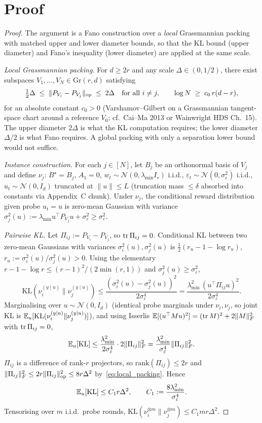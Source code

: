 \section*{Proof}

\begin{proof}
The argument is a Fano construction over a \emph{local} Grassmannian
packing with matched upper and lower diameter bounds, so that the KL
bound (upper diameter) and Fano's inequality (lower diameter) are
applied at the same scale.

\emph{Local Grassmannian packing.} For $d\ge 2r$ and any scale
$\Delta\in(0,1/2)$, there exist subspaces $V_1,\dots,V_N\in\mathrm{Gr}(r,d)$
satisfying
\begin{equation}
  \tfrac{1}{2}\Delta \;\le\; \|P_{V_i}-P_{V_j}\|_{\mathrm{op}} \;\le\; 2\Delta
  \quad\text{for all }i\ne j,
  \qquad \log N \;\ge\; c_0\, r(d-r),
\label{eq:local_packing}
\end{equation}
for an absolute constant $c_0>0$ (Varshamov--Gilbert on a Grassmannian
tangent-space chart around a reference $V_0$; cf.\ Cai--Ma 2013 or
Wainwright HDS Ch.~15). The upper diameter $2\Delta$ is what the KL
computation requires; the lower diameter $\Delta/2$ is what Fano
requires. A global packing with only a separation lower bound would
not suffice.

\emph{Instance construction.} For each $j\in[N]$, let $B_j$ be an
orthonormal basis of $V_j$ and define $\nu_j$: $B^\star=B_j$, $A_1=0$,
$w_t\sim\mathcal N(0,\lambda_{\min}I_r)$ i.i.d.,
$\varepsilon_t\sim\mathcal N(0,\sigma_\varepsilon^2)$ i.i.d.,
$u_t\sim\mathcal N(0,I_d)$ truncated at $\|u\|\le L$ (truncation mass
$\le\delta$ absorbed into constants via Appendix~C chunk). Under $\nu_j$,
the conditional reward distribution given probe $u_t=u$ is zero-mean
Gaussian with variance
$\sigma_j^2(u):=\lambda_{\min} u^\top P_{V_j} u+\sigma_\varepsilon^2\ge\sigma_\varepsilon^2$.

\emph{Pairwise KL.} Let $\Pi_{ij}:=P_{V_i}-P_{V_j}$, so
$\operatorname{tr}\Pi_{ij}=0$. Conditional KL between two zero-mean Gaussians with
variances $\sigma_i^2(u),\sigma_j^2(u)$ is
$\tfrac12(r_u-1-\log r_u)$, $r_u:=\sigma_i^2(u)/\sigma_j^2(u)>0$. Using
the elementary $r-1-\log r\le(r-1)^2/(2\min(r,1))$ and
$\sigma_j^2(u)\ge\sigma_\varepsilon^2$,
\[
\mathrm{KL}(\nu_i^{(y\mid u)}\|\nu_j^{(y\mid u)})
\le\frac{(\sigma_i^2(u)-\sigma_j^2(u))^2}{2\sigma_\varepsilon^4}
=\frac{\lambda_{\min}^2\,(u^\top\Pi_{ij}u)^2}{2\sigma_\varepsilon^4}.
\]
Marginalising over $u\sim\mathcal N(0,I_d)$ (identical probe marginals
under $\nu_i,\nu_j$, so joint KL is
$\mathbb{E}_u[\mathrm{KL}(\nu_i^{(y\mid u)}\|\nu_j^{(y\mid u)})]$), and using
Isserlis $\mathbb{E}[(u^\top M u)^2]=(\operatorname{tr} M)^2+2\|M\|_F^2$ with $\operatorname{tr}\Pi_{ij}=0$,
\[
\mathbb{E}_u[\mathrm{KL}]\le\frac{\lambda_{\min}^2}{2\sigma_\varepsilon^4}\cdot 2\|\Pi_{ij}\|_F^2
=\frac{\lambda_{\min}^2}{\sigma_\varepsilon^4}\|\Pi_{ij}\|_F^2.
\]
$\Pi_{ij}$ is a difference of rank-$r$ projectors, so
$\mathrm{rank}(\Pi_{ij})\le 2r$ and $\|\Pi_{ij}\|_F^2\le 2r\|\Pi_{ij}\|_{\mathrm{op}}^2\le 8r\Delta^2$ by~\eqref{eq:local_packing}. Hence
\[
\mathbb{E}_u[\mathrm{KL}]\le C_1 r\Delta^2,\qquad
C_1:=\frac{8\lambda_{\min}^2}{\sigma_\varepsilon^4}.
\]
Tensorising over $m$ i.i.d.\ probe rounds,
$\mathrm{KL}(\nu_i^{\otimes m}\|\nu_j^{\otimes m})\le C_1 m r\Delta^2$.


\end{proof}
